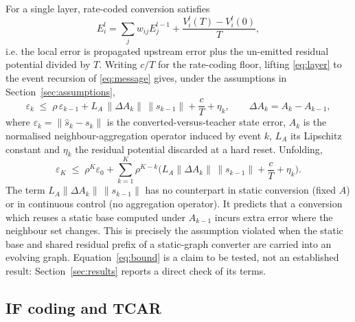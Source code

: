 \documentclass[preprint,12pt]{elsarticle}
\begin{document}
For a single layer, rate-coded conversion satisfies \cite{habara2024}
\begin{equation}
E_i^{l} = \sum_j w_{ij} E_j^{l-1} + \frac{V_i^{l}(T)-V_i^{l}(0)}{T},
\label{eq:layer}
\end{equation}
i.e. the local error is propagated upstream error plus the un-emitted residual potential divided by $T$. Writing $c/T$ for the rate-coding floor, lifting \eqref{eq:layer} to the event recursion of \eqref{eq:message} gives, under the assumptions in Section~\ref{sec:assumptions},
\begin{equation}
\varepsilon_k \;\le\; \rho\,\varepsilon_{k-1}
+ L_A\,\|\Delta A_k\|\,\|s_{k-1}\|
+ \frac{c}{T} + \eta_k ,
\qquad \Delta A_k = A_k - A_{k-1},
\label{eq:bound}
\end{equation}
where $\varepsilon_k=\|\hat{s}_k-s_k\|$ is the converted-versus-teacher state error, $A_k$ is the normalised neighbour-aggregation operator induced by event $k$, $L_A$ its Lipschitz constant and $\eta_k$ the residual potential discarded at a hard reset. Unfolding,
\begin{equation}
\varepsilon_K \;\le\; \rho^{K}\varepsilon_0
+ \sum_{k=1}^{K}\rho^{K-k}\Big(L_A\|\Delta A_k\|\,\|s_{k-1}\| + \frac{c}{T} + \eta_k\Big).
\label{eq:unfolded}
\end{equation}
The term $L_A\|\Delta A_k\|\,\|s_{k-1}\|$ has no counterpart in static conversion (fixed $A$) or in continuous control (no aggregation operator). It predicts that a conversion which reuses a static base computed under $A_{k-1}$ incurs extra error where the neighbour set changes. This is precisely the assumption violated when the static base and shared residual prefix of a static-graph converter are carried into an evolving graph. Equation~\eqref{eq:bound} is a claim to be tested, not an established result: Section~\ref{sec:results} reports a direct check of its terms.

\subsection{IF coding and TCAR}
\end{document}
